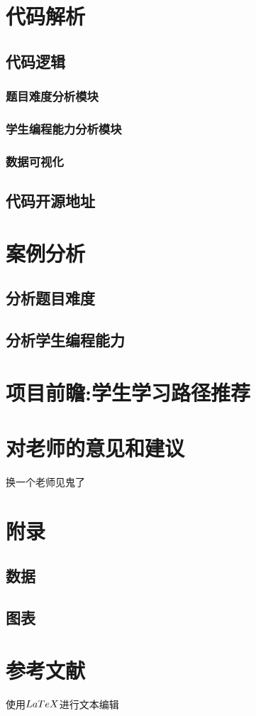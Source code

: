 \documentclass[a4paper]{ctexart}
\begin{document}
\section{代码解析}
\subsection{代码逻辑}
\subsubsection{题目难度分析模块}
\subsubsection{学生编程能力分析模块}
\subsubsection{数据可视化}
\subsection{代码开源地址}
\section{案例分析}
\subsection{分析题目难度}
\subsection{分析学生编程能力}
\section{项目前瞻:学生学习路径推荐}
\section{对老师的意见和建议}
换一个老师见鬼了
\section{附录}
\subsection{数据}
\subsection{图表}
\section{参考文献}

使用$\\LaTeX$进行文本编辑
\end{document}
